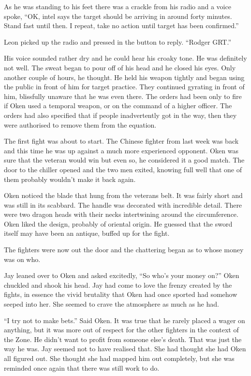 As he was standing to his feet there was a crackle from his radio and a voice spoke, ``OK, intel says the target should be arriving in around forty minutes.  Stand fast until then.  I repeat, take no action until target has been confirmed.''  

Leon picked up the radio and pressed in the button to reply.  ``Rodger GRT.''  

His voice sounded rather dry and he could hear his croaky tone.  He was definitely not well.  The sweat began to pour off of his head and he closed his eyes.  Only another couple of hours, he thought.  He held his weapon tightly and began using the public in front of him for target practice.  They continued gyrating in front of him, blissfully unaware that he was even there.  The orders had been only to fire if Oken used a temporal weapon, or on the command of a higher officer.  The orders had also specified that if people inadvertently got in the way, then they were authorised to remove them from the equation.



\thoughtbreak



The first fight was about to start.  The Chinese fighter from last week was back and this time he was up against a much more experienced opponent.  Oken was sure that the veteran would win but even so, he considered it a good match.  The door to the chiller opened and the two men exited, knowing full well that one of them probably wouldn't make it back again.

Oken noticed the blade that hung from the veterans belt.  It was fairly short and was still in its scabbard.  The handle was decorated with incredible detail.  There were two dragon heads with their necks intertwining around the circumference.  Oken liked the design, probably of oriental origin.  He guessed that the sword itself may have been an antique, buffed up for the fight.  

The fighters were now out the door and the chattering began as to whose money was on who.  

Jay leaned over to Oken and asked excitedly, ``So who's your money on?''  Oken chuckled and shook his head.  Jay had come to love the frenzy created by the fights, in essence the vivid brutality that Oken had once sported had somehow seeped into her.  She seemed to crave the atmosphere as much as he had.

``I try not to make bets.'' Said Oken.  It was true that he rarely placed a wager on anything, but it was more out of respect for the other fighters in the context of the Zone.  He didn't want to profit from someone else's death.  That was just the way he was.  Jay seemed not to have realised that.  She had thought she had Oken all figured out.  She thought she had mapped him out completely, but she was reminded once again that there was still work to do.

